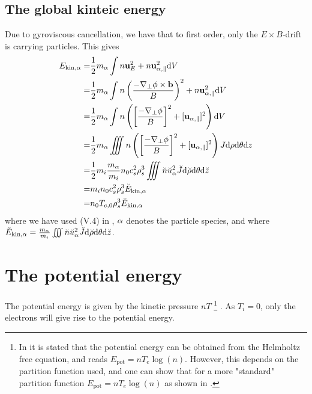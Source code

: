 \subsection{The global kinteic energy}
%
Due to gyroviscous cancellation, we have that to first order, only the $E\times B$-drift is carrying particles.
This gives
%
\begin{align*}
    E_{\text{kin},\alpha}
    =& \frac{1}{2}m_{\alpha}\int
       n\mathbf{u}_E^2
       + n\mathbf{u}_{\alpha,\parallel}^2 \text{d} V
     \\
    =& \frac{1}{2}m_{\alpha}\int
       n\left(\frac{-\nabla_\perp\phi
              \times\mathbf{b}}{B}\right)^2
       + n\mathbf{u}_{\alpha,\parallel}^2 \text{d} V
    \\
    =& \frac{1}{2}m_{\alpha}\int
       n\left(\left[\frac{-\nabla_\perp\phi}{B}\right]^2
       + [\mathbf{u}_{\alpha,\parallel}]^2\right) \text{d} V
   \\
    =& \frac{1}{2}m_{\alpha}\iiint
       n\left(\left[\frac{-\nabla_\perp\phi}{B}\right]^2
       + [\mathbf{u}_{\alpha,\parallel}]^2\right)
       J \text{d}\rho \text{d}\theta \text{d} z
    \\
    =& \frac{1}{2}m_i\frac{m_{\alpha}}{m_i}
       n_0c_s^2\rho_s^3
       \iiint
       \breve{n}\breve{u}_\alpha^2
       \breve{J} \text{d} \breve{\rho} \text{d}\theta \text{d} \breve{z}
    \\
    =& m_in_0c_s^2\rho_s^3 \breve{E}_{\text{kin},\alpha}
    \\
    =& n_0T_{e,0}\rho_s^3 \breve{E}_{\text{kin},\alpha}
\end{align*}
%
where we have used (V.4) in \cite{Dhaeseleer1991book}, $\alpha$ denotes the particle species, and where $\breve{E}_{\text{kin},\alpha} = \frac{m_{\alpha}}{m_i}\iiint \breve{n}\breve{u}_\alpha^2 \breve{J} \text{d} \breve{\rho} \text{d}\theta \text{d} \breve{z}$.

%
\section{The potential energy}
%
The potential energy is given by the kinetic pressure $nT$
%
\footnote{In \cite{Wiesenberger2014} it is stated that the potential energy can be obtained from the Helmholtz free equation, and reads $E_{\text{pot}}=nT_e\log(n)$.
    However, this depends on the partition function used, and one can show that for a more "standard" partition function $E_{\text{pot}}=nT_e\log(n)$ as shown in \cite{Kittel1980book}.}%
.
As $T_i=0$, only the electrons will give rise to the potential energy.

